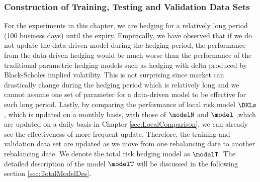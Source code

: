 \begin{enumerate}
\end{enumerate}

\subsubsection{Construction of Training, Testing and Validation Data Sets}
For the experiments in this chapter, we are hedging for a relatively long period (100 business days) until the expiry.  Empirically, we have observed that if we do not update the data-driven model during the hedging period, the performance from the data-driven hedging would be much worse than the performance of the traditional parametric hedging models such as hedging with delta produced by Black-Scholes implied volatility. This is not surprising since market can drastically change during the hedging period which is relatively long and we cannot assume one set of parameter for a data-driven model to be effective for such long period. Lastly, by comparing the performance of local risk model  $\DKLs$, which is updated on a monthly basis,  with those of $\modelN$ and $\model$ ,which are updated on a daily basis in Chapter \ref{sec:LocalComparison}, we can already see the effectiveness of more frequent update.  Therefore, the training and validation data set are updated as we move from one rebalancing date to another rebalancing date. We denote the total risk hedging model as $\modelT$. The detailed description of the model $\modelT$ will be discussed in the following section \ref{sec:TotalModelDes}.

